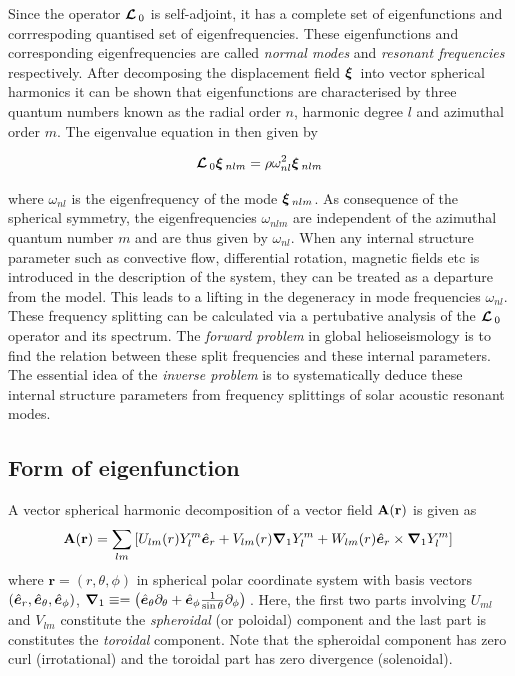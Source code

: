 Since the operator $\bm{\mathcal{L}}\,_0$ is self-adjoint, it has a complete set of eigenfunctions and corrrespoding quantised set of eigenfrequencies. These eigenfunctions and corresponding eigenfrequencies are called \textit{normal modes} and \textit{resonant frequencies} respectively. After decomposing the displacement field $\bm{\xi}\,$ into vector spherical harmonics it can be shown that eigenfunctions are characterised by three quantum numbers known as the radial order $n$, harmonic degree $l$ and azimuthal order $m$. The eigenvalue equation in then given by

\begin{equation}
\bm{\mathcal{L}}\,_{0}\bm{\xi}\,_{nlm} = \rho \omega_{nl}^2 \bm{\xi}\,_{nlm}
\end{equation}

where $\omega_{nl}$ is the eigenfrequency of the mode $\bm{\xi}\,_{nlm}$. As consequence of the spherical symmetry, the eigenfrequencies $\omega_{nlm}$ are independent of the azimuthal quantum number $m$ and are thus given by $\omega_{nl}$. When any internal structure parameter such as convective flow, differential rotation, magnetic fields etc is introduced in the description of the system, they can be treated as a departure from the \snr model. This leads to a lifting in the degeneracy in mode frequencies $\omega_{nl}$. These frequency splitting can be calculated via a pertubative analysis of the $\bm{\mathcal{L}}\,_0$ operator and its spectrum. The \textit{forward problem} in global helioseismology is to find the relation between these split frequencies and these internal parameters. The essential idea of the \textit{inverse problem} is to systematically deduce these internal structure parameters from frequency splittings of solar acoustic resonant modes.

\subsection{Form of eigenfunction}
A vector spherical harmonic decomposition of a vector field $\mathbf{A}(\mathbf{r})$ is given as 
\begin{equation}
\mathbf{A}(\mathbf{r}) = \sum_{lm} \left[ U_{lm}(r) Y_l^m \hat{\bm{e}}_{r} + V_{lm}(r) \bm{\nabla}_{1}Y_l^m + W_{lm}(r) \hat{\bm{e}}_{r} \times \bm{\nabla}_1 Y_{l}^{m} \right]\,
\end{equation}
where $\boldsymbol{r} = (r,\theta,\phi)$ in spherical polar coordinate system with basis vectors $(\hat{\bm{e}}_{r},\hat{\bm{e}}_{\theta},\hat{\bm{e}}_{\phi})$, $\bm{\nabla}_1 \equiv = \left( \hat{\bm{e}}_{\theta}\partial_{\theta} + \hat{\bm{e}}_{\phi}\frac{1}{\sin\theta}\partial_{\phi}  \right)\,$. Here, the first two parts involving $U_{ml}$ and $V_{lm}$ constitute the \textit{spheroidal} (or poloidal) component and the last part is constitutes the \textit{toroidal} component. Note that the spheroidal component has zero curl (irrotational) and the toroidal part has zero divergence (solenoidal).

